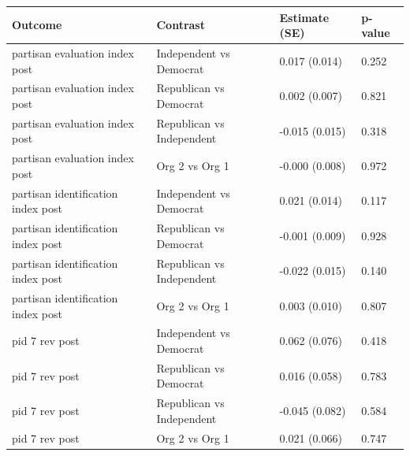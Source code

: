 
\begin{tabular}{llll}
\toprule
Outcome & Contrast & Estimate (SE) & p-value\\
\midrule
partisan evaluation index post & Independent vs Democrat & 0.017 (0.014) & 0.252\\
partisan evaluation index post & Republican vs Democrat & 0.002 (0.007) & 0.821\\
partisan evaluation index post & Republican vs Independent & -0.015 (0.015) & 0.318\\
partisan evaluation index post & Org 2 vs Org 1 & -0.000 (0.008) & 0.972\\
partisan identification index post & Independent vs Democrat & 0.021 (0.014) & 0.117\\
\addlinespace
partisan identification index post & Republican vs Democrat & -0.001 (0.009) & 0.928\\
partisan identification index post & Republican vs Independent & -0.022 (0.015) & 0.140\\
partisan identification index post & Org 2 vs Org 1 & 0.003 (0.010) & 0.807\\
pid 7 rev post & Independent vs Democrat & 0.062 (0.076) & 0.418\\
pid 7 rev post & Republican vs Democrat & 0.016 (0.058) & 0.783\\
\addlinespace
pid 7 rev post & Republican vs Independent & -0.045 (0.082) & 0.584\\
pid 7 rev post & Org 2 vs Org 1 & 0.021 (0.066) & 0.747\\
\bottomrule
\end{tabular}
